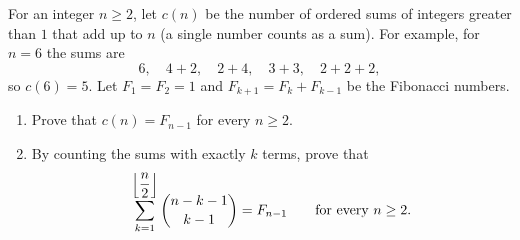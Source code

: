 For an integer $n\ge2$, let $c(n)$ be the number of ordered sums of integers greater than $1$ that add up to $n$ (a single number counts as a sum). For example, for $n=6$ the sums are
\[6,\quad 4+2,\quad 2+4,\quad 3+3,\quad 2+2+2,\]
so $c(6)=5$. Let $F_1=F_2=1$ and $F_{k+1}=F_k+F_{k-1}$ be the Fibonacci numbers.
\begin{enumerate}
\item[(a)] Prove that $c(n)=F_{n-1}$ for every $n\ge2$.
\item[(b)] By counting the sums with exactly $k$ terms, prove that
\[\sum_{k=1}^{\left\lfloor \dfrac n2\right\rfloor}\dbinom{n-k-1}{k-1}=F_{n-1}\qquad\text{for every } n\ge2.\]
\end{enumerate}
